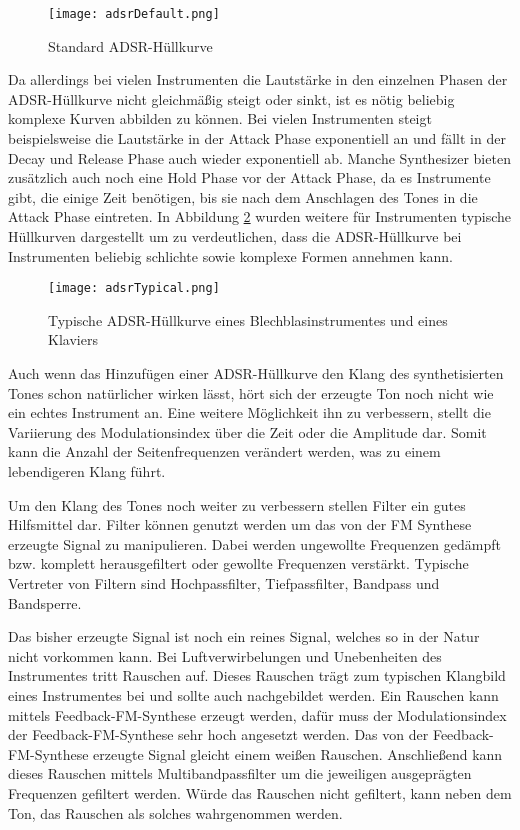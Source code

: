 \begin{figure} [ht]
\centering
  \texttt{[image: adsrDefault.png]}
\caption{Standard ADSR-Hüllkurve}
\label{fig:adsrDefault}
\end{figure}

Da allerdings bei vielen Instrumenten die Lautstärke in den einzelnen Phasen der ADSR-Hüllkurve nicht gleichmäßig steigt oder sinkt, ist es nötig beliebig komplexe Kurven abbilden zu können. Bei vielen Instrumenten steigt beispielsweise die Lautstärke in der Attack Phase exponentiell an und fällt in der Decay und Release Phase auch wieder exponentiell ab. Manche Synthesizer bieten zusätzlich auch noch eine Hold Phase vor der Attack Phase, da es Instrumente gibt, die einige Zeit benötigen, bis sie nach dem Anschlagen des Tones in die Attack Phase eintreten. In Abbildung \ref{fig:adsrTypical} wurden weitere für Instrumenten typische Hüllkurven dargestellt um zu verdeutlichen, dass die ADSR-Hüllkurve bei Instrumenten beliebig schlichte sowie komplexe Formen annehmen kann.

\begin{figure} [ht]
\centering
  \texttt{[image: adsrTypical.png]}
\caption{Typische ADSR-Hüllkurve eines Blechblasinstrumentes \cite{chowningPaper} und eines Klaviers}
\label{fig:adsrTypical} 
\end{figure}

Auch wenn das Hinzufügen einer ADSR-Hüllkurve den Klang des synthetisierten Tones schon natürlicher wirken lässt, hört sich der erzeugte Ton noch nicht wie ein echtes Instrument an. Eine weitere Möglichkeit ihn zu verbessern, stellt die Variierung des Modulationsindex über die Zeit oder die Amplitude dar. Somit kann die Anzahl der Seitenfrequenzen verändert werden, was zu einem lebendigeren Klang führt. \cite[S. 532]{chowningPaper}

Um den Klang des Tones noch weiter zu verbessern stellen Filter ein gutes Hilfsmittel dar. Filter können genutzt werden um das von der FM Synthese erzeugte Signal zu manipulieren. Dabei werden ungewollte Frequenzen gedämpft bzw. komplett herausgefiltert oder gewollte Frequenzen verstärkt. Typische Vertreter von Filtern sind Hochpassfilter, Tiefpassfilter, Bandpass und Bandsperre. \cite[S. 100-104]{stotz}

Das bisher erzeugte Signal ist noch ein reines Signal, welches so in der Natur nicht vorkommen kann. Bei Luftverwirbelungen und Unebenheiten des Instrumentes tritt Rauschen auf. Dieses Rauschen trägt zum typischen Klangbild eines Instrumentes bei und sollte auch nachgebildet werden. Ein Rauschen kann mittels Feedback-FM-Synthese erzeugt werden, dafür muss der Modulationsindex der Feedback-FM-Synthese sehr hoch angesetzt werden. Das von der Feedback-FM-Synthese erzeugte Signal gleicht einem weißen Rauschen. Anschließend kann dieses Rauschen mittels Multibandpassfilter um die jeweiligen ausgeprägten Frequenzen gefiltert werden. Würde das Rauschen nicht gefiltert, kann neben dem Ton, das Rauschen als solches wahrgenommen werden. \cite[S. 152]{barkowsky}

